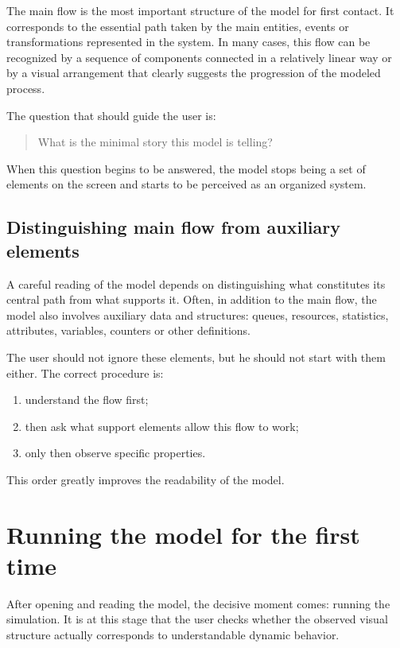 The main flow is the most important structure of the model for first contact. It corresponds to the essential path taken by the main entities, events or transformations represented in the system. In many cases, this flow can be recognized by a sequence of components connected in a relatively linear way or by a visual arrangement that clearly suggests the progression of the modeled process.

The question that should guide the user is:
\begin{quote}
What is the minimal story this model is telling?
\end{quote}

When this question begins to be answered, the model stops being a set of elements on the screen and starts to be perceived as an organized system.

\subsection{Distinguishing main flow from auxiliary elements}
\label{subsec:cap4_fluxo_principal_elementos_auxiliares}

A careful reading of the model depends on distinguishing what constitutes its central path from what supports it. Often, in addition to the main flow, the model also involves auxiliary data and structures: queues, resources, statistics, attributes, variables, counters or other definitions.

The user should not ignore these elements, but he should not start with them either. The correct procedure is:
\begin{enumerate}
\item understand the flow first;
\item then ask what support elements allow this flow to work;
\item only then observe specific properties.
\end{enumerate}

This order greatly improves the readability of the model.

\section{Running the model for the first time}
\label{sec:cap4_executando_modelo_primeira_vez}

After opening and reading the model, the decisive moment comes: running the simulation. It is at this stage that the user checks whether the observed visual structure actually corresponds to understandable dynamic behavior.

